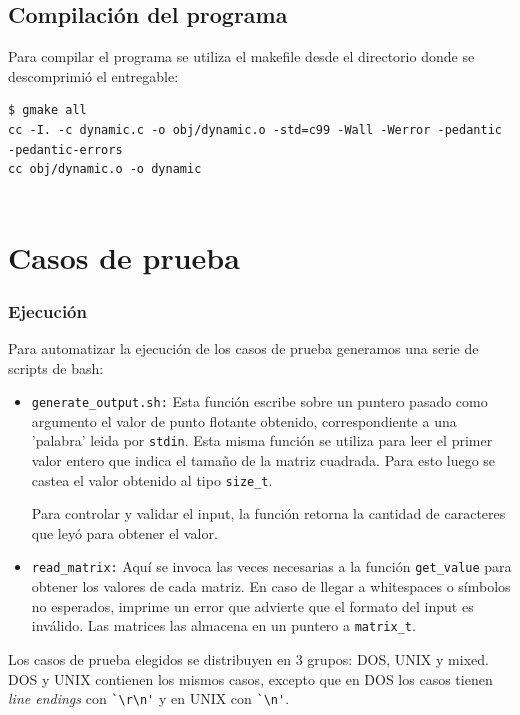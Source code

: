 \documentclass[a4paper,10pt, spanish]{article}
\begin{document}


\lstset{
  language=bash,
  basicstyle=\small\ttfamily
}

\subsection{Compilación del programa}
Para compilar el programa se utiliza el makefile desde el directorio donde se descomprimió el entregable:
\begin{lstlisting}
$ gmake all
cc -I. -c dynamic.c -o obj/dynamic.o -std=c99 -Wall -Werror -pedantic -pedantic-errors
cc obj/dynamic.o -o dynamic
	
\end{lstlisting}

\section{Casos de prueba}

\subsubsection{Ejecución}

Para automatizar la ejecución de los casos de prueba generamos una serie de scripts de bash:

\begin{itemize}
  \item \lstinline{generate_output.sh:} Esta función escribe sobre un puntero pasado como argumento el valor de punto flotante obtenido, correspondiente a una 'palabra' leida por \lstinline{stdin}. 
  Esta misma función se utiliza para leer el primer valor entero que indica el tamaño de la matriz cuadrada. Para esto luego se castea el valor obtenido al tipo \lstinline{size_t}.
  
  Para controlar y validar el input, la función retorna la cantidad de caracteres que leyó para obtener el valor.
	\item \lstinline{read_matrix:} Aquí se invoca las veces necesarias a la función \lstinline{get_value} para obtener los valores de cada matriz.
  En caso de llegar a whitespaces o símbolos no esperados, imprime un error que advierte que el formato del input es inválido. Las matrices las almacena en un puntero a \lstinline{matrix_t}.
\end{itemize}

Los casos de prueba elegidos se distribuyen en 3 grupos: DOS, UNIX y mixed. \\
DOS y UNIX contienen los mismos casos, excepto que en DOS los casos tienen \textit{line endings}
con \lstinline{`\r\n'} y en UNIX con \lstinline{`\n'}.
\end{document}
